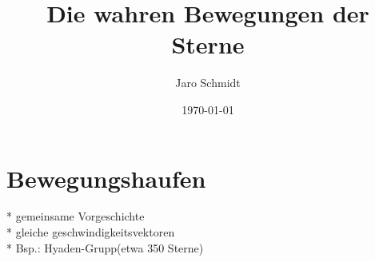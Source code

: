 \documentclass[12pt]{article}
\title{Die wahren Bewegungen der Sterne}
\author{Jaro Schmidt}
\date{\today}
\begin{document}
	\maketitle
	
	\section{Bewegungshaufen}
		* gemeinsame Vorgeschichte\\
		* gleiche geschwindigkeitsvektoren\\
		* Bsp.: Hyaden-Grupp(etwa 350 Sterne)\\
		
\end{document}
